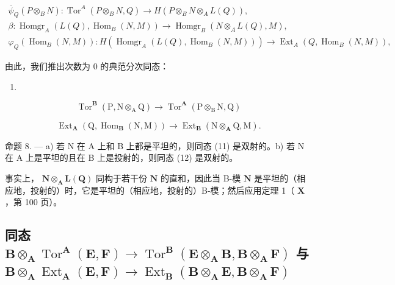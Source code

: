 \[
\begin{array}{c} \overline {{\psi}} _ {Q} (P \otimes_ {B} N): \operatorname{Tor} ^ {A} (P \otimes_ {B} N, Q) \to H (P \otimes_ {B} N \otimes_ {A} L (Q)), \\ \beta : \operatorname{Homgr} _ {A} (L (Q), \operatorname{Hom} _ {B} (N, M)) \to \operatorname{Homgr} _ {B} (N \otimes_ {A} L (Q), M), \\ \varphi_ {Q} (\operatorname{Hom} _ {B} (N, M)): H (\operatorname{Homgr} _ {A} (L (Q), \operatorname{Hom} _ {B} (N, M))) \to \operatorname{Ext} _ {A} (Q, \operatorname{Hom} _ {B} (N, M)), \end{array}
\]

由此，我们推出次数为 0 的典范分次同态：

\begin{enumerate}
\def\labelenumi{(\arabic{enumi})}
\setcounter{enumi}{10}
\tightlist
\item
\end{enumerate}

\[
\operatorname{Tor} ^ {\mathbf {B}} (\mathrm{P}, \mathrm{N} \otimes_ {\mathrm{A}} \mathrm{Q}) \rightarrow \operatorname{Tor} ^ {\mathbf {A}} (\mathrm{P} \otimes_ {\mathrm{B}} \mathrm{N}, \mathrm{Q})\tag{12}
\]

\[
\operatorname{Ext} _ {\mathbf {A}} \left(\mathrm{Q}, \operatorname{Hom} _ {\mathbf {B}} (\mathrm{N}, \mathrm{M})\right)\rightarrow \operatorname{Ext} _ {\mathbf {B}} \left(\mathrm{N} \otimes_ {\mathbf {A}} \mathrm{Q}, \mathrm{M}\right).
\]

命题 8. --- a) 若 N 在 A 上和 B 上都是平坦的，则同态 (11) 是双射的。b) 若 N 在 A 上是平坦的且在 B 上是投射的，则同态 (12) 是双射的。

事实上， \(\mathbf{N} \otimes_{\mathbf{A}} \mathbf{L}(\mathbf{Q})\) 同构于若干份 \(\mathbf{N}\) 的直和，因此当 B-模 \(\mathbf{N}\) 是平坦的（相应地，投射的）时，它是平坦的（相应地，投射的）B-模；然后应用定理 1（ \(\mathbf{X}\) ，第 100 页）。

\subsection{\texorpdfstring{同态 \(\mathbf{B} \otimes_{\mathbf{A}} \operatorname{Tor}^{\mathbf{A}}(\mathbf{E}, \mathbf{F}) \to \operatorname{Tor}^{\mathbf{B}}(\mathbf{E} \otimes_{\mathbf{A}} \mathbf{B}, \mathbf{B} \otimes_{\mathbf{A}} \mathbf{F})\) 与 \(\mathbf{B} \otimes_{\mathbf{A}} \operatorname{Ext}_{\mathbf{A}}(\mathbf{E}, \mathbf{F}) \to \operatorname{Ext}_{\mathbf{B}}(\mathbf{B} \otimes_{\mathbf{A}} \mathbf{E}, \mathbf{B} \otimes_{\mathbf{A}} \mathbf{F})\)}{Tor 与 Ext 的标量扩张同态}}

